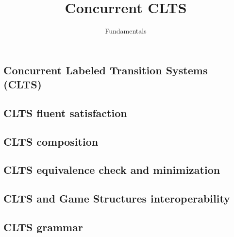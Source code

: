 \documentclass{article}
\title{Concurrent CLTS} %
\author{Fundamentals} %
\date{}
\begin{document}
\maketitle

\setcounter{section}{1} %
\setcounter{theorem}{1} %

\subsection{Concurrent Labeled Transition Systems (CLTS)}


\subsection{CLTS fluent satisfaction}


\subsection{CLTS composition}


\subsection{CLTS equivalence check and minimization}


\newpage
\subsection{CLTS and Game Structures interoperability}


\subsection{CLTS grammar}

\end{document}
